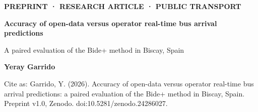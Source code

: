 \documentclass[11pt,a4paper]{article}
\newcommand{\doidatos}{doi:10.5281/zenodo.24286027}
\begin{document}
\thispagestyle{primera}

\begin{tcolorbox}[enhanced, colback=ruta, colframe=ruta, arc=0mm, left=7mm, right=7mm, top=6mm, bottom=6mm,
  boxsep=0mm, width=\linewidth]
\color{white}\sffamily
{\footnotesize\bfseries\MakeUppercase{Preprint · Research article · Public transport}}\par\vspace{3mm}
{\LARGE\bfseries Accuracy of open-data versus operator real-time bus arrival predictions\par}
\vspace{1.5mm}
{\large A paired evaluation of the Bide+ method in Biscay, Spain\par}
\vspace{5mm}
{\normalsize\bfseries Yeray Garrido}\par
\vspace{2mm}
{\footnotesize Cite as: Garrido, Y. (2026). Accuracy of open-data versus operator real-time bus arrival predictions:
a paired evaluation of the Bide+ method in Biscay, Spain. Preprint v1.0, Zenodo. \doidatos.\par}
\end{tcolorbox}

\vspace{4mm}
\end{document}
